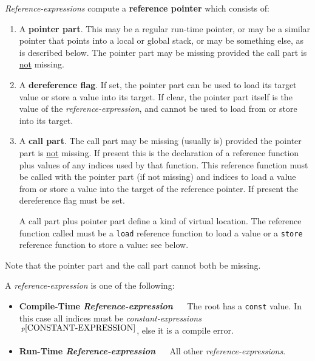 \documentclass[12pt]{article}
\newcommand{\key}[1]{{\rm \bfseries #1}}
\newcommand{\pagnote}[1]{$\,^{p\pageref{#1}}$}
\begin{document}
{\em Reference-expressions} compute a
\key{reference pointer}\label{REFERENCE-POINTER} which consists of:
\begin{enumerate}
\item A \key{pointer part}.
This may be a regular run-time pointer, or may be a similar pointer that
points into a local or global
stack, or may be something else, as is described below.
The pointer part may be missing provided the call part is \underline{not}
missing.
\item A \key{dereference flag}.  If set, the pointer part
can be used to load its target value or store a value into its target.
If clear, the pointer part
itself is the value of the {\em reference-expression}, and cannot
be used to load from or store into its target.
\item A \key{call part}.
The call part may be missing (usually is) provided the pointer part
is \underline{not} missing.
If present
this is the declaration of a reference function plus values of any
indices used by that function.  This reference function must be called with
the pointer part (if not missing) and indices to 
load a value from or store a value into the target of the reference pointer.
If present the dereference flag must be set.

A call part plus pointer part define a kind of virtual
location.  The reference function called must be a {\tt load}
reference function to load a value or a
{\tt store} reference function to store a value: see below.
\end{enumerate}

Note that the pointer part and the call part cannot both be missing.

A {\em reference-expression} is one of the following:
\begin{itemize}
\item \key{Compile-Time {\em Reference-expression}} ~~
The root has a {\tt const} value.  In this
case all indices must be
{\em constant-expressions}\pagnote{CONSTANT-EXPRESSION}, else it is
a compile error.
\item \key{Run-Time {\em Reference-expression}} ~~
All other {\em reference-expressions}.
\end{itemize}
\end{document}
